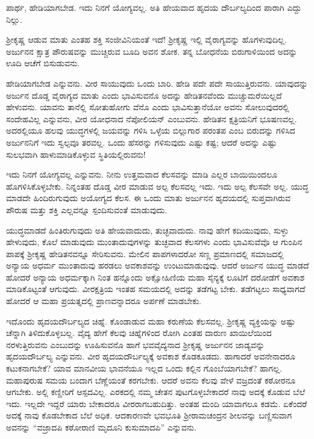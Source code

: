 {\small ಪಾರ್ಥ, ಹೇಡಿಯಾಗಬೇಡ. ಇದು ನಿನಗೆ ಯೋಗ್ಯವಲ್ಲ. ಅತಿ ಹೇಯವಾದ ಹೃದಯ ದೌರ್ಬಲ್ಯದಿಂದ ಪಾರಾಗಿ ಎದ್ದು ನಿಲ್ಲು.}

ಶ್ರೀಕೃಷ್ಣ ಆಡುವ ಮಾತು ಎಂತಹ ಶಕ್ತಿ ಸಂಜೀವಿನಿಯಂತೆ ಇದೆ! ಶ್ರೀಕೃಷ್ಣ ಇಲ್ಲಿ ವೈರಾಗ್ಯವನ್ನು ಹೊಗಳುವುದಿಲ್ಲ. ಅರ್ಜುನನ ಕ್ಷಾತ್ರ ಪೌರುಷವನ್ನು ಮುಚ್ಚಿರುವ ಬೂದಿ ಅವನ ಶೋಕ. ತನ್ನ ಬೋಧನೆಯ ಬಿರುಗಾಳಿಯಿಂದ ಅದನ್ನು ಊದಿ ಆಚೆಗೆ ಬಿಸುಡುವನು.

ಹೇಡಿಯಾಗಬೇಡ ಎನ್ನುವನು. ವೀರ ಸಾಯುವುದು ಒಂದು ಬಾರಿ. ಹೇಡಿ ಪದೇ ಪದೇ ಸಾಯುತ್ತಿರುವನು. ಯಾವುದನ್ನು ಅರ್ಜುನ ದೊಡ್ಡ ವೈರಾಗ್ಯದ ಮಾತು ಎಂದು ಭಾವಿಸುವನೊ ಅದನ್ನು ಹೇಡಿತನವೆಂದು ಮುಚ್ಚುಮರೆಯಿಲ್ಲದೆ ಹೇಳುವನು. ಯಾವನು ತಾನೆಲ್ಲಿ ಸೋತುಹೋಗು ವೆನೊ ಎಂದು ಭಾವಿಸುತ್ತಾನೆಯೋ ಅವನು ಸೋಲುವುದರಲ್ಲಿ ಸಂದೇಹವಿಲ್ಲ ಎನ್ನುವನು, ವೀರ ಯೋಧನಾದ ನೆಪೋಲಿಯನ್ ಎಂಬುವನು. ಹೇಡಿತನ ಕ್ಷತ್ರಿಯನಿಗೆ ಭೂಷಣವಲ್ಲ. ಅದರಲ್ಲಿಯೂ ಹಲವು ಯುದ್ಧಗಳಲ್ಲಿ ಜಯವನ್ನು ಗಳಿಸಿ ಒಳ್ಳೆಯ ಬಿಲ್ಲುಗಾರ ಪರಂತಪ ಎಂಬ ಬಿರುದನ್ನು ಗಳಿಸಿದ ಅರ್ಜುನನಿಗೆ ಇದು ಸ್ವಲ್ಪವೂ ತರವಲ್ಲ. ಒಂದು ಹೆಸರನ್ನು ಗಳಿಸುವುದು ಎಷ್ಟು ಕಷ್ಟ; ಆದರೆ ಅದನ್ನು ಎಷ್ಟು ಸುಲಭವಾಗಿ ಹಾಳುಮಾಡಿಕೊಳ್ಳುವ ಸ್ಥಿತಿಯಲ್ಲಿರುವನು!

ಇದು ನಿನಗೆ ಯೋಗ್ಯವಲ್ಲ ಎನ್ನುವನು. ನೀನು ಉತ್ತಮವಾದ ಕೆಲಸವನ್ನು ಮಾಡಿ ಎಲ್ಲರ ಬಾಯಿಯಿಂದಲೂ ಹೊಗಳಿಸಿಕೊಳ್ಳಬೇಕು. ನಿನ್ನಂತಹ ದೊಡ್ಡ ವೀರ ಮಾಡುವ ಅಲ್ಪ ಕೆಲಸವಲ್ಲ ಇದು. ಇದು ಅಲ್ಪ ಕೆಲಸವೇ ಅಲ್ಲ. ಯುದ್ಧ ಮಾಡದೇ ಹಿಂದಿರುಗುವುದು ಅಯೋಗ್ಯದ ಕೆಲಸ. ಈ ಒಂದು ಮಾತು ಅರ್ಜುನನ ಹೃದಯದಲ್ಲಿ ಸುಪ್ತವಾಗಿರುವ ಪೌರುಷ ಮತ್ತು ಶಕ್ತಿ ಎಲ್ಲವನ್ನೂ ಸ್ಪಂದಿಸುವಂತೆ ಮಾಡುವುದು.

ಯುದ್ಧಮಾಡದೆ ಹಿಂತಿರುಗುವುದು ಅತಿ ಹೇಯವಾದುದು, ತುಚ್ಛವಾದುದು. ನಾವು ಹೇಗೆ ಕದಿಯುವುದು, ಸುಳ್ಳು ಹೇಳುವುದು, ಕೊಲೆ ಮಾಡುವುದು ಮುಂತಾದುವುಗಳನ್ನು ತುಚ್ಛವಾದ ಕೆಲಸಗಳು ಎಂದು ಭಾವಿಸುವೆವೊ ಆ ಗುಂಪಿನ ಪಾಪಕ್ಕೆ ಶ್ರೀಕೃಷ್ಣ ಹೇಡಿತನವನ್ನೂ ಸೇರಿಸುವನು. ಮೇಲಿನ ಪಾಪಗಳಾದರೋ ಸಣ್ಣ ಪ್ರಮಾಣದಲ್ಲಿ ಸಮಾಜದಲ್ಲಿ ಅನ್ಯಾಯ ಅಧರ್ಮ ಮುಂತಾದುವು ಹರಡಲು ಅವಕಾಶವನ್ನು ಉಂಟುಮಾಡುವುವು. ಆದರೆ ಅರ್ಜುನ ಯುದ್ಧ ಮಾಡದೆ ಹೋದರೆ ಅನ್ಯಾಯ ಅಧರ್ಮಕ್ಕಾಗಿ ನಿಂತ ಹನ್ನೊಂದು ಅಕ್ಷೋಹಿಣಿಯ ಮಹಾ ಸೈನ್ಯಕ್ಕೆ ಲೂಟಿಗೆ ದರೋಡೆಗೆ ಅವಕಾಶ ಮಾಡಿಕೊಟ್ಟಂತೆ ಆಗುವುದು. ವೀರಕ್ಷತ್ರಿಯ ಇಂತಹ ಸಮಯದಲ್ಲಿ ಅದನ್ನು ತಡೆಗಟ್ಟ ಬೇಕು. ತಡೆಗಟ್ಟಲು ಸಾಧ್ಯವಾಗದೆ ಹೋದರೆ ಆ ಮಹಾ ಪ್ರಯತ್ನದಲ್ಲಿ ಪ್ರಾಣವನ್ನಾದರೂ ಅರ್ಪಣೆ ಮಾಡಬೇಕು.

ಇದೊಂದು ಹೃದಯದೌರ್ಬಲ್ಯದ ಚಿಹ್ನೆ. ಕೊಂಡಾಡುವ ಮಹಾ ಕರುಣೆಯ ಕೆಲಸವಲ್ಲ. ಶ್ರೀಕೃಷ್ಣ ವ್ಯಕ್ತಿಯನ್ನು ಅಷ್ಟು ಚೆನ್ನಾಗಿ ತಿಳಿದುಕೊಳ್ಳಬಲ್ಲ. ವೈದ್ಯ ಹೇಗೆ ಕೆಲವು ಚಿಹ್ನೆಗಳಿಂದ ರೋಗಿ ಎಂತಹ ದಾರುಣ ಖಾಯಿಲೆಯಿಂದ ನರಳುತ್ತಿರುವನು ಎಂಬುದನ್ನು ಊಹಿಸುವನೊ ಹಾಗೆ ಭವವೈದ್ಯನಾದ ಶ್ರೀಕೃಷ್ಣ ಅರ್ಜುನನ ಜಾಡ್ಯವನ್ನು ಹೃದಯದೌರ್ಬಲ್ಯ ಎನ್ನುವನು. ವೀರ ಹೃದಯದೌರ್ಬಲ್ಯಕ್ಕೆ ಅವಕಾಶ ಕೊಡಕೂಡದು. ಹಾಗಾದರೆ ಅವನೇನಾದರೂ ಕಟುಕನಾಗಬೇಕೆ? ಯಾವ ಮಾನವೀಯ ಭಾವನೆಯೂ ಇಲ್ಲದ ಒಂದು ಕಲ್ಲಿನ ಗೊಂಬೆಯಾಗಬೇಕೆ? ಹಾಗಲ್ಲ. ಮಹಾಪುರುಷ ಸಮಯ ಬಂದಾಗ ಬೆಣ್ಣೆಯಂತೆ ಕರಗಬೇಕು. ಆದರೆ ಅವನು ಕೆಲವು ವೇಳೆ ವಜ್ರದಂತೆ ಕಠೋರನೂ ಆಗಬೇಕು. ಅಲ್ಲಿ ಕಣ್ಣೀರಿಗೆ ಆಸ್ಪದವಿಲ್ಲ. ಎರಕದಲ್ಲಿ ನಮ್ಮ ಚೇತನ ಪುಟಗೊಳ್ಳಬೇಕಾದರೆ ನಾವು ಅದಕ್ಕೆ ಕೊಡುವ ಬೆಲೆ ಇದು. ಇಲ್ಲದೇ ಇದ್ದರೆ ಯಾರು ಬೇಕಾದರೂ ವೀರರಾಗಬಹುದಿತ್ತು. ಅಂತಹ ಮಂದಿ ಯಾವಾಗಲೂ ಕಡಮೆ. ಏಕೆಂದರೆ ಅದಕ್ಕೆ ನಾವು ಕೊಡಬೇಕಾದ ಬೆಲೆ ಅಧಿಕ. ಆದಕಾರಣವೇ ಭವಭೂತಿ ಶ್ರೀರಾಮಚಂದ್ರನ ಶೀಲವನ್ನು ಬಣ್ಣಿಸುವಾಗ ಅವನನ್ನು “ವಜ್ರಾದಪಿ ಕಠೋರಾಣಿ ಮೃದೂನಿ ಕುಸುಮಾದಪಿ” ಎನ್ನುವನು.

